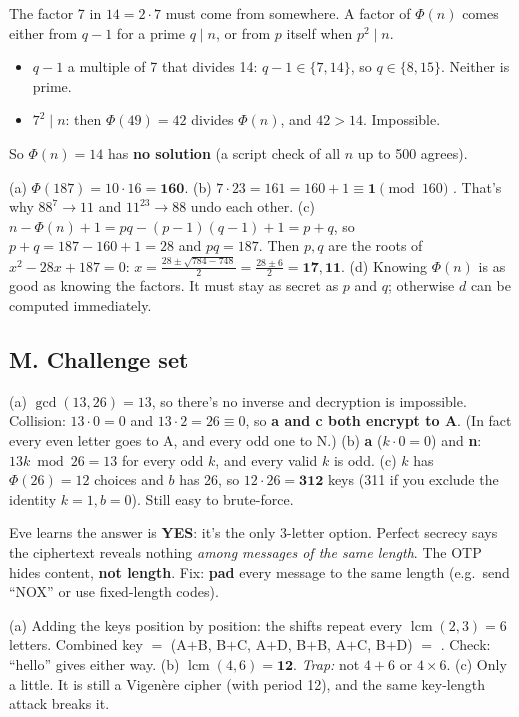 \ans The factor 7 in $14 = 2\cdot7$ must come from somewhere. A factor of $\Phi(n)$ comes either from $q - 1$ for a prime $q \mid n$, or from $p$ itself when $p^2 \mid n$.
\begin{itemize}
  \item $q - 1$ a multiple of 7 that divides 14: $q - 1 \in \{7, 14\}$, so $q \in \{8, 15\}$. Neither is prime.
  \item $7^2 \mid n$: then $\Phi(49) = 42$ divides $\Phi(n)$, and $42 > 14$. Impossible.
\end{itemize}
So $\Phi(n) = 14$ has \textbf{no solution} (a script check of all $n$ up to 500 agrees).

\ans (a) $\Phi(187) = 10\cdot16 = \mathbf{160}$.
(b) $7\cdot23 = 161 = 160 + 1 \equiv \mathbf{1} \pmod{160}$ \checkmark. That's why $88^7 \to 11$ and $11^{23} \to 88$ undo each other.
(c) $n - \Phi(n) + 1 = pq - (p-1)(q-1) + 1 = p + q$, so $p + q = 187 - 160 + 1 = 28$ and $pq = 187$.
Then $p, q$ are the roots of $x^2 - 28x + 187 = 0$: $x = \frac{28 \pm \sqrt{784 - 748}}{2} = \frac{28 \pm 6}{2} = \mathbf{17, 11}$.
(d) Knowing $\Phi(n)$ is as good as knowing the factors. It must stay as secret as $p$ and $q$; otherwise $d$ can be computed immediately.

\subsection*{M. Challenge set}

\ans (a) $\gcd(13, 26) = 13$, so there's no inverse and decryption is impossible. Collision: $13 \cdot 0 = 0$ and $13 \cdot 2 = 26 \equiv 0$, so \textbf{a and c both encrypt to A}. (In fact every even letter goes to A, and every odd one to N.)
(b) \textbf{a} ($k\cdot0 = 0$) and \textbf{n}: $13k \bmod 26 = 13$ for every odd $k$, and every valid $k$ is odd.
(c) $k$ has $\Phi(26) = 12$ choices and $b$ has 26, so $12 \cdot 26 = \mathbf{312}$ keys (311 if you exclude the identity $k = 1, b = 0$). Still easy to brute-force.

\ans Eve learns the answer is \textbf{YES}: it's the only 3-letter option. Perfect secrecy says the ciphertext reveals nothing \emph{among messages of the same length}. The OTP hides content, \textbf{not length}.
Fix: \textbf{pad} every message to the same length (e.g.\ send ``NOX'' or use fixed-length codes).

\ans (a) Adding the keys position by position: the shifts repeat every $\operatorname{lcm}(2, 3) = 6$ letters.
Combined key $=$ (A$+$B, B$+$C, A$+$D, B$+$B, A$+$C, B$+$D) $=$ \textbf{}. Check: ``hello'' gives  either way.
(b) $\operatorname{lcm}(4, 6) = \mathbf{12}$. \emph{Trap:} not $4 + 6$ or $4 \times 6$.
(c) Only a little. It is still a Vigen\`ere cipher (with period 12), and the same key-length attack breaks it.

